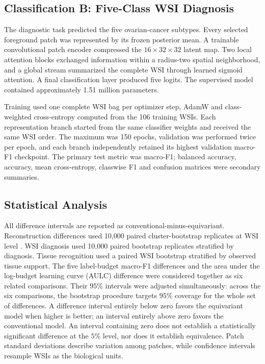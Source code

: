 \documentclass[conference,a4paper]{IEEEtran}
\begin{document}
\subsection{Classification B: Five-Class WSI Diagnosis}

The diagnostic task predicted the five ovarian-cancer subtypes. Every selected
foreground patch was represented by its frozen posterior mean. A trainable
convolutional patch encoder compressed the $16\times32\times32$ latent map.
Two local attention blocks exchanged information within a radius-two spatial
neighborhood, and a global stream summarized the complete WSI through learned
sigmoid attention. A final classification layer produced five logits. The
supervised model contained approximately 1.51 million parameters.

Training used one complete WSI bag per optimizer step, AdamW and class-weighted
cross-entropy computed from the 106 training WSIs. Each representation branch
started from the same classifier weights and received the same WSI order. The
maximum was 150 epochs, validation was performed twice per epoch, and each
branch independently retained its highest validation macro-F1 checkpoint.
The primary test metric was macro-F1; balanced accuracy, accuracy, mean
cross-entropy, classwise F1 and confusion matrices were secondary summaries.

\subsection{Statistical Analysis}

All difference intervals are reported as conventional-minus-equivariant.
Reconstruction differences used 10,000 paired cluster-bootstrap replicates at
WSI level \cite{field_bootstrapping_2007}. WSI diagnosis used 10,000 paired
bootstrap replicates stratified by diagnosis. Tissue recognition used a paired
WSI bootstrap stratified by observed tissue support. The five label-budget
macro-F1 differences and the area under the log-budget learning curve (AULC)
difference were considered together as six related comparisons. Their $95\%$
intervals were adjusted simultaneously: across the six comparisons, the
bootstrap procedure targets $95\%$ coverage for the whole set of differences.
A difference interval entirely below zero favors the equivariant model when
higher is better; an interval entirely above zero favors the conventional
model. An interval containing zero does not establish a statistically
significant difference at the $5\%$ level, nor does it establish equivalence.
Patch standard deviations describe variation among patches, while confidence
intervals resample WSIs as the biological units.
\end{document}
